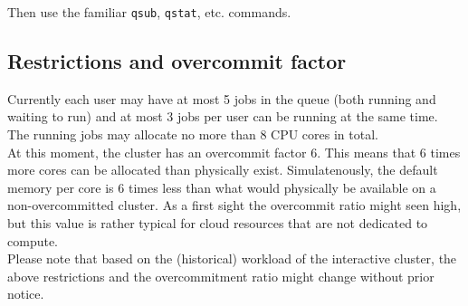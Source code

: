 \begin{prompt}
\end{prompt}

Then use the familiar \lstinline|qsub|, \lstinline|qstat|, etc. commands.

\subsection{Restrictions and overcommit factor}
\label{subsec:interactive_ugent_restrictions}

Currently each user may have at most 5 jobs in the queue (both running and waiting to run)
and at most 3 jobs per user can be running at the same time. The running jobs may allocate 
no more than 8 CPU cores in total. \\
At this moment, the cluster has an overcommit factor 6. This means that 6 times more cores
can be allocated than physically exist. Simulatenously, the default memory per core is 6
times less than what would physically be available on a non-overcommitted cluster. 
As a first sight the overcommit ratio might seen high, but this value is rather typical
for cloud resources that are not dedicated to compute. \\
Please note that based on the (historical) workload of the interactive cluster, the above
restrictions and the overcommitment ratio might change without prior notice.
